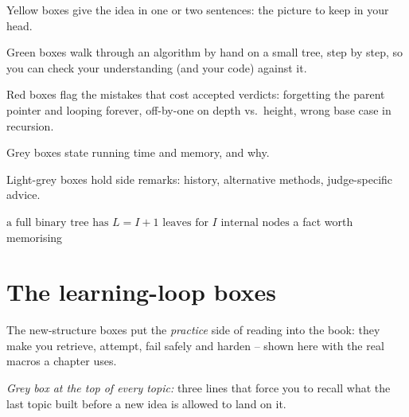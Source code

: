 \begin{insightbox}
Yellow boxes give the idea in one or two sentences: the picture to keep in your head.
\end{insightbox}

\begin{tracebox}
Green boxes walk through an algorithm by hand on a small tree, step by step, so you can check your understanding (and your code) against it.
\end{tracebox}

\begin{warningbox}
Red boxes flag the mistakes that cost accepted verdicts: forgetting the parent pointer and looping forever, off-by-one on depth vs.\ height, wrong \nil{} base case in recursion.
\end{warningbox}

\begin{complexitybox}
Grey boxes state running time and memory, and why.
\end{complexitybox}

\begin{notebox}
Light-grey boxes hold side remarks: history, alternative methods, judge-specific advice.
\end{notebox}

\begin{formulabox}
$\text{a full binary tree has } L = I + 1 \text{ leaves for } I \text{ internal nodes}$ \qquad a fact worth memorising
\end{formulabox}

\section*{The learning-loop boxes}

The new-structure boxes put the \emph{practice} side of reading into the book:
they make you retrieve, attempt, fail safely and harden -- shown here with the
real macros a chapter uses.

\begin{previouslybox}
\emph{Grey box at the top of every topic:} three lines that force you to recall
what the last topic built before a new idea is allowed to land on it.
\end{previouslybox}

\begin{recognitionbox}
\end{recognitionbox}

